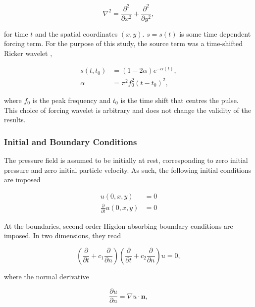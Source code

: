 \documentclass[final-report]{report-template}
\begin{document}
\begin{equation}
    \nabla^2
    =
    \frac{\partial^2}{\partial x^2}
    +
    \frac{\partial^2}{\partial y^2},
    \label{eq:lap}
\end{equation}

for time $t$ and the spatial coordinates $(x,y)$. $s = s(t)$ is some time dependent forcing term. For the purpose of this study, the source term was a time-shifted Ricker wavelet \cite{rickerWaveletFunctionsTheir1944}, 

\begin{align}
    s(t, t_0) &= \left( 1 - 2\alpha \right)e^{ -\alpha(t)}, \label{eq:ricker}\\
    \alpha &= \pi^2 f^2_0(t - t_0)^2,
\end{align}

where $f_0$ is the peak frequency and $t_0$ is the time shift that centres the pulse. This choice of forcing wavelet is arbitrary and does not change the validity of the results.

\subsubsection{Initial and Boundary Conditions}
\label{subsect:conditions}

The pressure field is assumed to be initially at rest, corresponding to zero initial pressure and zero initial particle velocity. As such, the following initial conditions are imposed

\begin{align}
    u(0, x, y) &= 0 \label{eq:u0} \\
    \frac{\partial}{\partial t}u(0, x, y) & = 0 \label{eq:ut0}
\end{align}

At the boundaries, second order Higdon \cite{higdonNumericalAbsorbingBoundary1987a} absorbing boundary conditions are imposed. In two dimensions, they read

\begin{equation}
    \left( \frac{\partial}{\partial t} + c_1 \frac{\partial}{\partial n} \right)
    \left( \frac{\partial}{\partial t} + c_2 \frac{\partial}{\partial n} \right) u = 0,
    \label{eq:higdon}
\end{equation}

where the normal derivative

\begin{equation}
    \frac {\partial u} {\partial n} = \nabla u \cdot \mathbf{n},
    \label{eq:dudn}
\end{equation}
\end{document}
